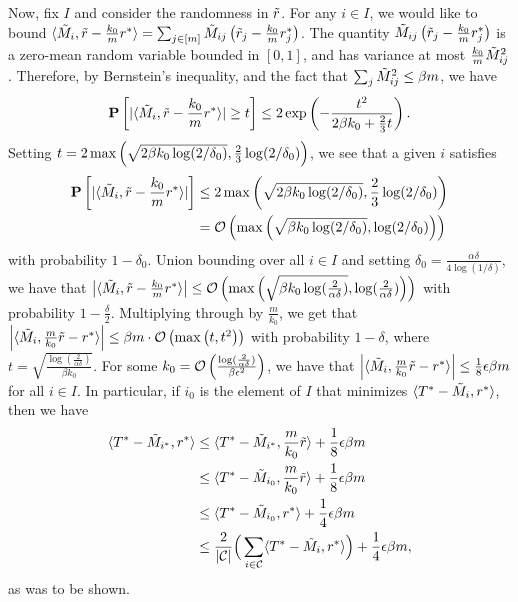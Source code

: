 Now, fix $I$ and consider the randomness in $\tilde{r}$. For any $i \in I$, 
we would like to bound $\langle \tilde{M}_i, \tilde{r} - \frac{k_0}{m} r^* \rangle = \sum_{j \in [m]} \tilde{M}_{ij} \left( \tilde{r}_j - \frac{k_0}{m} r^*_j \right)$. 
The quantity $\tilde{M}_{ij} \left( \tilde{r}_j - \frac{k_0}{m} r^*_j \right)$ is a zero-mean random variable 
bounded in $[0,1]$, and has variance at most $\frac{k_0}{m}\tilde{M}_{ij}^2$. Therefore, by Bernstein's inequality, 
and the fact that $\sum_j \tilde{M}_{ij}^2 \leq \beta m$, we have 
\begin{equation}
\mathbf{P}\left[|\langle \tilde{M}_i, \tilde{r} - \frac{k_0}{m}r^* \rangle| \geq t\right] \leq 2\exp\left( -\frac{t^2}{2\beta k_0 + \frac{2}{3}t} \right).
\end{equation}
Setting $t = 2\max\left( \sqrt{2\beta k_0\log(2/\delta_0)}, \frac{2}{3}\log(2/\delta_0) \right)$, 
we see that a given $i$ satisfies 
\begin{align}
\mathbf{P}\left[|\langle \tilde{M}_i, \tilde{r} - \frac{k_0}{m}r^* \rangle|\right] 
 &\leq 2\max\left( \sqrt{2\beta k_0\log(2/\delta_0)}, \frac{2}{3}\log(2/\delta_0) \right) \\
 &= \mathcal{O}\left( \max\left( \sqrt{\beta k_0\log(2/\delta_0)}, \log(2/\delta_0) \right) \right)
\end{align}
with probability $1-\delta_0$. Union bounding over all $i \in I$ and 
setting $\delta_0 = \frac{\alpha\delta}{4\log(1/\delta)}$, we have that 
$\left|\langle \tilde{M}_i, \tilde{r} - \frac{k_0}{m}r^* \rangle\right| \leq \mathcal{O}\left( \max\left( \sqrt{\beta k_0\log(\frac{2}{\alpha\delta})},\log(\frac{2}{\alpha\delta}) \right) \right)$ 
with probability $1-\frac{\delta}{2}$.
%
Multiplying through by $\frac{m}{k_0}$, we get that
$\left|\langle \tilde{M}_i, \frac{m}{k_0}\tilde{r} - r^* \rangle\right| \leq \beta m\cdot \mathcal{O}\left( \max\left( t, t^2 \right) \right)$ with probability $1-\delta$, 
where $t = \sqrt{\frac{\log(\frac{2}{\alpha\delta})}{\beta k_0}}$.
For some $k_0 = \mathcal{O}\left( \frac{\log(\frac{2}{\alpha\delta})}{\beta\epsilon^2} \right)$, we have that 
$\left|\langle \tilde{M}_i, \frac{m}{k_0}\tilde{r} - r^* \rangle\right| \leq \frac{1}{8}\epsilon\beta m$
for all $i \in I$. In particular, if $i_0$ is the element of $I$ that 
minimizes $\langle T^* - \tilde{M}_i, r^* \rangle$, then we have
\begin{align}
\langle T^* - \tilde{M}_{i^*}, r^* \rangle 
 &\leq \langle T^* - \tilde{M}_{i^*}, \frac{m}{k_0}\tilde{r} \rangle + \frac{1}{8}\epsilon\beta m \\
 &\leq \langle T^* - \tilde{M}_{i_0}, \frac{m}{k_0}\tilde{r} \rangle + \frac{1}{8}\epsilon\beta m \\
 &\leq \langle T^* - \tilde{M}_{i_0}, r^* \rangle + \frac{1}{4}\epsilon\beta m \\
 &\leq \frac{2}{|\mathcal{C}|} \Big(\sum_{i \in \mathcal{C}} \langle T^* - \tilde{M}_i, r^* \rangle\Big) + \frac{1}{4}\epsilon\beta m,
\end{align}
as was to be shown.
